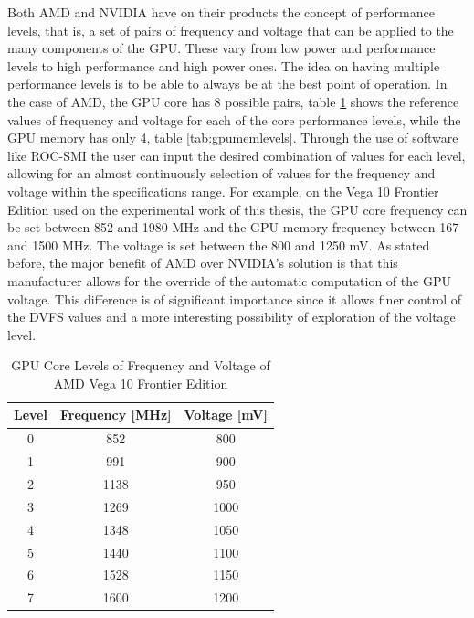 Both AMD and NVIDIA have on their products the concept of performance levels, that is, a set of pairs of frequency and voltage that can be applied to the many components of the GPU. These vary from low power and performance levels to high performance and high power ones. The idea on having multiple performance levels is to be able to always be at the best point of operation.  In the case of AMD, the GPU core has 8 possible pairs, table \ref{tab:gpucorelevels} shows the reference values of frequency and voltage for each of the core performance levels, while the GPU memory has only 4, table \ref{tab:gpumemlevels}. Through the use of software like ROC-SMI \cite{noauthor_radeonopencompute/roc-smi_2019} the user can input the desired combination of values for each level, allowing for an almost continuously selection of values for the frequency and voltage within the specifications range. For example, on the Vega 10 Frontier Edition used on the experimental work of this thesis, the GPU core frequency can be set between 852 and 1980 MHz and the GPU memory frequency between 167 and 1500 MHz. The voltage is set between the 800 and 1250 mV. As stated before, the major benefit of AMD over NVIDIA's solution is that this manufacturer allows for the override of the automatic computation of the GPU voltage. This difference is of significant importance since it allows finer control of the DVFS values and a more interesting possibility of exploration of the voltage level.

\begin{table}[!htb]
\renewcommand{\arraystretch}{1.2} %
\centering
\begin{tabular}{ccc}
\textbf{Level} & \textbf{Frequency {[}MHz{]}} & \textbf{Voltage {[}mV{]}} \\ \hline
0              & 852                          & 800                       \\
1              & 991                          & 900                       \\
2              & 1138                         & 950                       \\
3              & 1269                         & 1000                      \\
4              & 1348                         & 1050                      \\
5              & 1440                         & 1100                      \\
6              & 1528                         & 1150                      \\
7              & 1600                         & 1200                      \\ \hline
\end{tabular}
\caption{GPU Core Levels of Frequency and Voltage of AMD Vega 10 Frontier Edition}
\label{tab:gpucorelevels}
\end{table}

